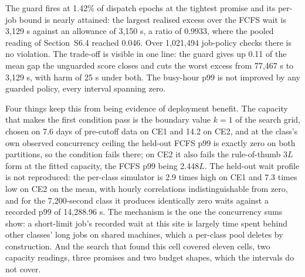 \documentclass[mathematics,supfile,submit,moreauthors]{Definitions/mdpi}
\newcommand{\devnum}[1]{#1}
\begin{document}
The guard fires at \devnum{1.42\%} of dispatch epochs at the tightest promise and its
per-job bound is nearly attained: the largest realised excess over the FCFS wait is
\devnum{3{,}129} s against an allowance of \devnum{3{,}150} s, a ratio of
\devnum{0.9933}, where the pooled reading of Section~S6.4 reached \devnum{0.046}. Over
\devnum{1{,}021{,}494} job-policy checks there is no violation. The trade-off is visible
in one line: the guard gives up \devnum{0.11} of the mean gap the unguarded score closes
and cuts the worst excess from \devnum{77{,}467} s to \devnum{3{,}129} s, with harm of
\devnum{25} s under both. The busy-hour p99 is not improved by any guarded policy, every
interval spanning zero.

Four things keep this from being evidence of deployment benefit. The capacity that makes
the first condition pass is the boundary value $k=\devnum{1}$ of the search grid, chosen
on \devnum{7.6} days of pre-cutoff data on CE1 and \devnum{14.2} on CE2, and at the
class's own observed concurrency ceiling the held-out FCFS p99 is exactly zero on both
partitions, so the condition fails there; on CE2 it also fails the rule-of-thumb
\devnum{3}$L$ form at the fitted capacity, the FCFS p99 being \devnum{2.448}$L$. The
held-out wait profile is not reproduced: the per-class simulator is \devnum{2.9} times
high on CE1 and \devnum{7.3} times low on CE2 on the mean, with hourly correlations
indistinguishable from zero, and for the \devnum{7{,}200}-second class it produces
identically zero waits against a recorded p99 of \devnum{14{,}288.96} s. The mechanism is
the one the concurrency sums show: a short-limit job's recorded wait at this site is
largely time spent behind other classes' long jobs on shared machines, which a per-class
pool deletes by construction. And the search that found this cell covered eleven cells,
two capacity readings, three promises and two budget shapes, which the intervals do not
cover.
\end{document}
